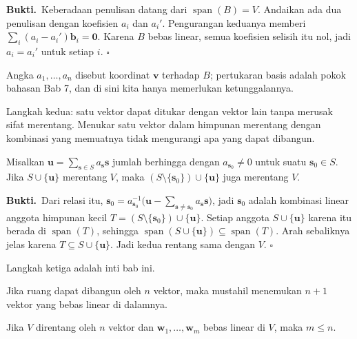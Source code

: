 \par\medskip\noindent\textbf{Bukti.}\ 
Keberadaan penulisan datang dari $\operatorname{span}(B)=V$. Andaikan ada dua penulisan
dengan koefisien $a_{i}$ dan $a_{i}'$. Pengurangan keduanya memberi
$\sum_{i}(a_{i}-a_{i}')\mathbf{b}_{i}=\mathbf{0}$. Karena $B$ bebas linear, semua koefisien
selisih itu nol, jadi $a_{i}=a_{i}'$ untuk setiap $i$.
\hfill$\square$\par\medskip

Angka $a_{1},\dots,a_{n}$ disebut koordinat $\mathbf{v}$ terhadap $B$; pertukaran basis
adalah pokok bahasan Bab 7, dan di sini kita hanya memerlukan ketunggalannya.

Langkah kedua: satu vektor dapat ditukar dengan vektor lain tanpa merusak sifat merentang.
Menukar satu vektor dalam himpunan merentang dengan kombinasi yang memuatnya tidak mengurangi
apa yang dapat dibangun.

\begin{lemma}[Penukaran]
Misalkan $\mathbf{u}=\sum_{\mathbf{s}\in S}a_{\mathbf{s}}\mathbf{s}$ jumlah berhingga dengan
$a_{\mathbf{s}_{0}}\neq 0$ untuk suatu $\mathbf{s}_{0}\in S$. Jika $S\cup\{\mathbf{u}\}$
merentang $V$, maka $(S\setminus\{\mathbf{s}_{0}\})\cup\{\mathbf{u}\}$ juga merentang $V$.
\end{lemma}

\par\medskip\noindent\textbf{Bukti.}\ 
Dari relasi itu,
$\mathbf{s}_{0}=a_{\mathbf{s}_{0}}^{-1}\bigl(\mathbf{u}-\sum_{\mathbf{s}\neq\mathbf{s}_{0}}a_{\mathbf{s}}\mathbf{s}\bigr)$,
jadi $\mathbf{s}_{0}$ adalah kombinasi linear anggota himpunan kecil
$T=(S\setminus\{\mathbf{s}_{0}\})\cup\{\mathbf{u}\}$. Setiap anggota $S\cup\{\mathbf{u}\}$
karena itu berada di $\operatorname{span}(T)$, sehingga
$\operatorname{span}(S\cup\{\mathbf{u}\})\subseteq\operatorname{span}(T)$. Arah sebaliknya
jelas karena $T\subseteq S\cup\{\mathbf{u}\}$. Jadi kedua rentang sama dengan $V$.
\hfill$\square$\par\medskip

Langkah ketiga adalah inti bab ini.

Jika ruang dapat dibangun oleh $n$ vektor, maka mustahil menemukan $n+1$ vektor yang bebas
linear di dalamnya.

\begin{teorema}[Pertukaran]
Jika $V$ direntang oleh $n$ vektor dan $\mathbf{w}_{1},\dots,\mathbf{w}_{m}$ bebas linear di
$V$, maka $m\le n$.
\end{teorema}


